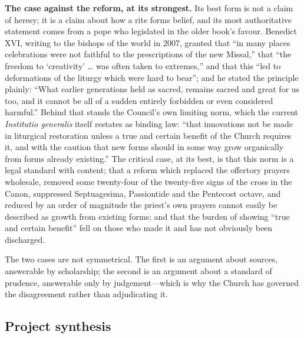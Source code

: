 \textbf{The case against the reform, at its strongest.} Its best form is not a claim of heresy; it is a claim about how a rite forms belief, and its most authoritative statement comes from a pope who legislated in the older book's favour. Benedict XVI, writing to the bishops of the world in 2007, granted that ``in many places celebrations were not faithful to the prescriptions of the new Missal,'' that ``the freedom to `creativity' \dots{} was often taken to extremes,'' and that this ``led to deformations of the liturgy which were hard to bear''; and he stated the principle plainly: ``What earlier generations held as sacred, remains sacred and great for us too, and it cannot be all of a sudden entirely forbidden or even considered harmful.'' Behind that stands the Council's own limiting norm, which the current \emph{Institutio generalis} itself restates as binding law: ``that innovations not be made in liturgical restoration unless a true and certain benefit of the Church requires it, and with the caution that new forms should in some way grow organically from forms already existing.'' The critical case, at its best, is that this norm is a legal standard with content; that a reform which replaced the offertory prayers wholesale, removed some twenty-four of the twenty-five signs of the cross in the Canon, suppressed Septuagesima, Passiontide and the Pentecost octave, and reduced by an order of magnitude the priest's own prayers cannot easily be described as growth from existing forms; and that the burden of showing ``true and certain benefit'' fell on those who made it and has not obviously been discharged.

The two cases are not symmetrical. The first is an argument about sources, answerable by scholarship; the second is an argument about a standard of prudence, answerable only by judgement---which is why the Church has governed the disagreement rather than adjudicating it.

\subsection{Project synthesis}

